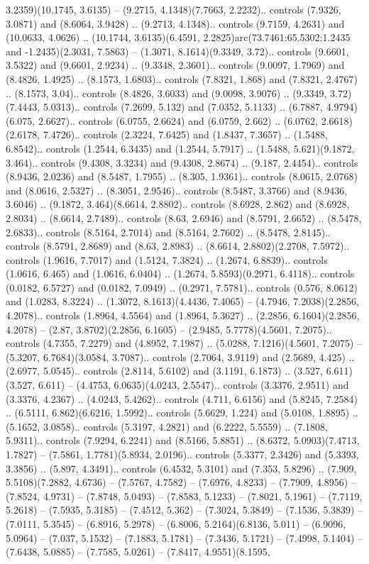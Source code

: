 3.2359)(10.1745, 3.6135) -- (9.2715, 4.1348)(7.7663, 2.2232).. controls (7.9326, 3.0871) and (8.6064, 3.9428) .. (9.2713, 4.1348).. controls (9.7159, 4.2631) and (10.0633, 4.0626) .. (10.1744, 3.6135)(6.4591, 2.2825)arc(73.7461:65.5302:1.2435 and -1.2435)(2.3031, 7.5863) -- (1.3071, 8.1614)(9.3349, 3.72).. controls (9.6601, 3.5322) and (9.6601, 2.9234) .. (9.3348, 2.3601).. controls (9.0097, 1.7969) and (8.4826, 1.4925) .. (8.1573, 1.6803).. controls (7.8321, 1.868) and (7.8321, 2.4767) .. (8.1573, 3.04).. controls (8.4826, 3.6033) and (9.0098, 3.9076) .. (9.3349, 3.72)(7.4443, 5.0313).. controls (7.2699, 5.132) and (7.0352, 5.1133) .. (6.7887, 4.9794)(6.075, 2.6627).. controls (6.0755, 2.6624) and (6.0759, 2.662) .. (6.0762, 2.6618)(2.6178, 7.4726).. controls (2.3224, 7.6425) and (1.8437, 7.3657) .. (1.5488, 6.8542).. controls (1.2544, 6.3435) and (1.2544, 5.7917) .. (1.5488, 5.621)(9.1872, 3.464).. controls (9.4308, 3.3234) and (9.4308, 2.8674) .. (9.187, 2.4454).. controls (8.9436, 2.0236) and (8.5487, 1.7955) .. (8.305, 1.9361).. controls (8.0615, 2.0768) and (8.0616, 2.5327) .. (8.3051, 2.9546).. controls (8.5487, 3.3766) and (8.9436, 3.6046) .. (9.1872, 3.464)(8.6614, 2.8802).. controls (8.6928, 2.862) and (8.6928, 2.8034) .. (8.6614, 2.7489).. controls (8.63, 2.6946) and (8.5791, 2.6652) .. (8.5478, 2.6833).. controls (8.5164, 2.7014) and (8.5164, 2.7602) .. (8.5478, 2.8145).. controls (8.5791, 2.8689) and (8.63, 2.8983) .. (8.6614, 2.8802)(2.2708, 7.5972).. controls (1.9616, 7.7017) and (1.5124, 7.3824) .. (1.2674, 6.8839).. controls (1.0616, 6.465) and (1.0616, 6.0404) .. (1.2674, 5.8593)(0.2971, 6.4118).. controls (0.0182, 6.5727) and (0.0182, 7.0949) .. (0.2971, 7.5781).. controls (0.576, 8.0612) and (1.0283, 8.3224) .. (1.3072, 8.1613)(4.4436, 7.4065) -- (4.7946, 7.2038)(2.2856, 4.2078).. controls (1.8964, 4.5564) and (1.8964, 5.3627) .. (2.2856, 6.1604)(2.2856, 4.2078) -- (2.87, 3.8702)(2.2856, 6.1605) -- (2.9485, 5.7778)(4.5601, 7.2075).. controls (4.7355, 7.2279) and (4.8952, 7.1987) .. (5.0288, 7.1216)(4.5601, 7.2075) -- (5.3207, 6.7684)(3.0584, 3.7087).. controls (2.7064, 3.9119) and (2.5689, 4.425) .. (2.6977, 5.0545).. controls (2.8114, 5.6102) and (3.1191, 6.1873) .. (3.527, 6.611)(3.527, 6.611) -- (4.4753, 6.0635)(4.0243, 2.5547).. controls (3.3376, 2.9511) and (3.3376, 4.2367) .. (4.0243, 5.4262).. controls (4.711, 6.6156) and (5.8245, 7.2584) .. (6.5111, 6.862)(6.6216, 1.5992).. controls (5.6629, 1.224) and (5.0108, 1.8895) .. (5.1652, 3.0858).. controls (5.3197, 4.2821) and (6.2222, 5.5559) .. (7.1808, 5.9311).. controls (7.9294, 6.2241) and (8.5166, 5.8851) .. (8.6372, 5.0903)(7.4713, 1.7827) -- (7.5861, 1.7781)(5.8934, 2.0196).. controls (5.3377, 2.3426) and (5.3393, 3.3856) .. (5.897, 4.3491).. controls (6.4532, 5.3101) and (7.353, 5.8296) .. (7.909, 5.5108)(7.2882, 4.6736) -- (7.5767, 4.7582) -- (7.6976, 4.8233) -- (7.7909, 4.8956) -- (7.8524, 4.9731) -- (7.8748, 5.0493) -- (7.8583, 5.1233) -- (7.8021, 5.1961) -- (7.7119, 5.2618) -- (7.5935, 5.3185) -- (7.4512, 5.362) -- (7.3024, 5.3849) -- (7.1536, 5.3839) -- (7.0111, 5.3545) -- (6.8916, 5.2978) -- (6.8006, 5.2164)(6.8136, 5.011) -- (6.9096, 5.0964) -- (7.037, 5.1532) -- (7.1883, 5.1781) -- (7.3436, 5.1721) -- (7.4998, 5.1404) -- (7.6438, 5.0885) -- (7.7585, 5.0261) -- (7.8417, 4.9551)(8.1595, 